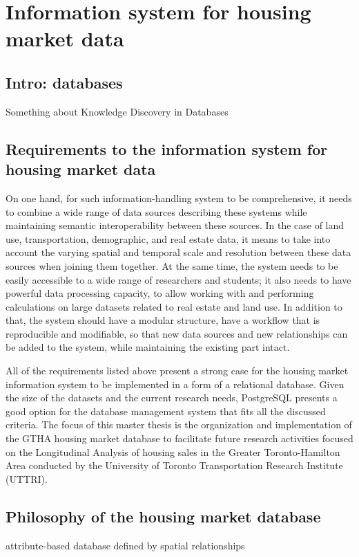 \chapter{Information system for housing market data} \label{ch:information_system_for_housing_market_data}

\section{Intro: databases}

Something about Knowledge Discovery in Databases

\section{Requirements to the information system for housing market data} \label{sec:requirements_to_information_system}

On one hand, for such information-handling system to be comprehensive, it needs to combine a wide range of data sources describing these systems while maintaining semantic interoperability between these sources.
In the case of land use, transportation, demographic, and real estate data, it means to take into account the varying spatial and temporal scale and resolution between these data sources when joining them together.
At the same time, the system needs to be easily accessible to a wide range of researchers and students;
it also needs to have powerful data processing capacity, to allow working with and performing calculations on large datasets related to real estate and land use.
In addition to that, the system should have a modular structure, have a workflow that is reproducible and modifiable, so that new data sources and new relationships can be added to the system, while maintaining the existing part intact.

All of the requirements listed above present a strong case for the housing market information system to be implemented in a form of a relational database.
Given the size of the datasets and the current research needs, PostgreSQL presents a good option for the database management system that fits all the discussed criteria.
The focus of this master thesis is the organization and implementation of the GTHA housing market database to facilitate future research activities focused on the Longitudinal Analysis of housing sales in the Greater Toronto-Hamilton Area conducted by the University of Toronto Transportation Research Institute (UTTRI).

\section{Philosophy of the housing market database} \label{sec:housing_market_database_philosophy}
attribute-based database defined by spatial relationships

